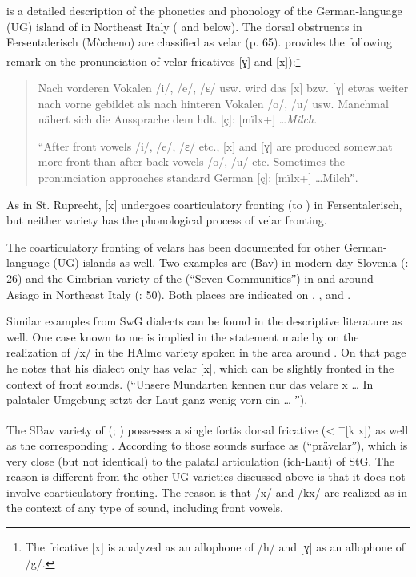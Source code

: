 \citet{Rowley1986} is a detailed description of the phonetics and phonology of the German-language (UG) island of  in Northeast Italy ( and  below). The dorsal obstruents in Fersentalerisch (Mòcheno) are classified as velar (p. 65). \citet[143]{Rowley1986} provides the following remark on the pronunciation of velar fricatives [ɣ] and [x]):\footnote{The fricative [x] is analyzed as an allophone of /h/ and [ɣ] as an allophone of /g/.}

\begin{quote}
Nach vorderen Vokalen /i/, /e/, /ɛ/ usw. wird das [x] bzw. [ɣ] etwas weiter nach vorne gebildet als nach hinteren Vokalen /o/, /u/ usw. Manchmal nä\-hert sich die Aussprache dem hdt. [ç]: [mïlx+] …\textit{Milch}.

“After front vowels /i/, /e/, /ɛ/ etc., [x] and [ɣ] are produced somewhat more front than after back vowels /o/, /u/ etc. Sometimes the pronunciation approaches standard German [ç]: [mïlx+] …Milchˮ.
\end{quote}

As in St. Ruprecht, [x] undergoes coarticulatory fronting (to ) in Fersentalerisch, but neither variety has the phonological process of velar fronting.

The coarticulatory fronting of velars has been documented for other German-language (UG) islands as well. Two examples are  (Bav) in modern-day Slovenia (\citealt{Tschinkel1908}: 26) and the Cimbrian variety of the  (“Seven Communitiesˮ) in and around Asiago in Northeast Italy (\citealt{Kranzmayer1956}: 50). Both places are indicated on , , and .

Similar examples from SwG dialects can be found in the descriptive literature as well. One case known to me is implied in the statement made by \citet[11]{Baumgartner1922} on the realization of /x/ in the HAlmc variety spoken in the area around . On that page he notes that his dialect only has velar [x], which can be slightly fronted in the context of front sounds. (“Unsere Mundarten kennen nur das velare x … In palataler Umgebung setzt der Laut ganz wenig vorn ein … ˮ).

The SBav variety of  (\citealt{Kollmann2007}; ) possesses a single fortis dorsal fricative (<  \textsuperscript{+}[k x]) as well as the corresponding . According to \citet[175]{Kollmann2007} those sounds surface as  (“prävelarˮ), which is very close (but not identical) to the palatal articulation (ich-Laut) of StG. The reason  is different from the other UG varieties discussed above is that it does not involve coarticulatory fronting. The reason is that /x/ and /kx/ are realized as  in the context of any type of sound, including front vowels.

